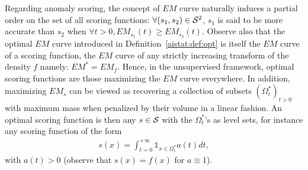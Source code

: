Regarding anomaly scoring, the concept of $EM$ curve naturally induces a partial order on the set of all scoring functions: $\forall (s_1,s_2)\in \S^2$, $s_1$ is said to be more accurate than $s_2$ when $\forall t > 0, EM_{s_1}(t) \geq EM_{s_2}(t)$. Observe also that the optimal $EM$ curve introduced in Definition~\ref{aistat:def:opt} is itself the $EM$ curve of a scoring function, the $EM$ curve of any strictly increasing transform of the density $f$ namely: $EM^*=EM_f$. Hence, in the unsupervised framework, optimal scoring functions are those maximizing the $EM$ curve everywhere. In addition, maximizing $EM_s$ can be viewed as recovering a collection of subsets $(\Omega^*_t)_{t>0}$ with maximum mass when penalized by their volume in a linear fashion. An optimal scoring function is then any $s\in \S$  with the $\Omega^*_t$'s as level sets, for instance any scoring function of the form
\noindent
\begin{align}\label{aistat:score_cont}
s(x)=\int_{t=0}^{+\infty} \mathds{1}_{x\in \Omega^*_t}a(t)dt,
\end{align} 
with $a(t)>0$ (observe that $s(x)=f(x)$ for $a \equiv 1$).

